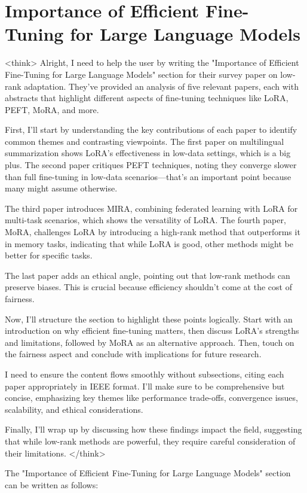 \documentclass[conference]{IEEEtran}
\begin{document}
\section{Importance of Efficient Fine-Tuning for Large Language Models}
<think>
Alright, I need to help the user by writing the "Importance of Efficient Fine-Tuning for Large Language Models" section for their survey paper on low-rank adaptation. They've provided an analysis of five relevant papers, each with abstracts that highlight different aspects of fine-tuning techniques like LoRA, PEFT, MoRA, and more.

First, I'll start by understanding the key contributions of each paper to identify common themes and contrasting viewpoints. The first paper on multilingual summarization shows LoRA's effectiveness in low-data settings, which is a big plus. The second paper critiques PEFT techniques, noting they converge slower than full fine-tuning in low-data scenarios—that's an important point because many might assume otherwise.

The third paper introduces MIRA, combining federated learning with LoRA for multi-task scenarios, which shows the versatility of LoRA. The fourth paper, MoRA, challenges LoRA by introducing a high-rank method that outperforms it in memory tasks, indicating that while LoRA is good, other methods might be better for specific tasks.

The last paper adds an ethical angle, pointing out that low-rank methods can preserve biases. This is crucial because efficiency shouldn't come at the cost of fairness.

Now, I'll structure the section to highlight these points logically. Start with an introduction on why efficient fine-tuning matters, then discuss LoRA's strengths and limitations, followed by MoRA as an alternative approach. Then, touch on the fairness aspect and conclude with implications for future research.

I need to ensure the content flows smoothly without subsections, citing each paper appropriately in IEEE format. I'll make sure to be comprehensive but concise, emphasizing key themes like performance trade-offs, convergence issues, scalability, and ethical considerations.

Finally, I'll wrap up by discussing how these findings impact the field, suggesting that while low-rank methods are powerful, they require careful consideration of their limitations.
</think>

The "Importance of Efficient Fine-Tuning for Large Language Models" section can be written as follows:
\end{document}
